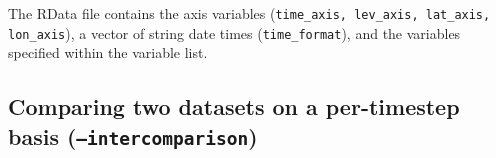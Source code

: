 \documentclass{article}
\begin{document}
%
%
%


The RData file contains the axis variables (\texttt{time\_axis, lev\_axis, lat\_axis, lon\_axis}), a vector of string date times (\texttt{time\_format}), and the variables specified within the variable list. 

\subsection{Comparing two datasets on a per-timestep basis (\texttt{--intercomparison})}
\end{document}
